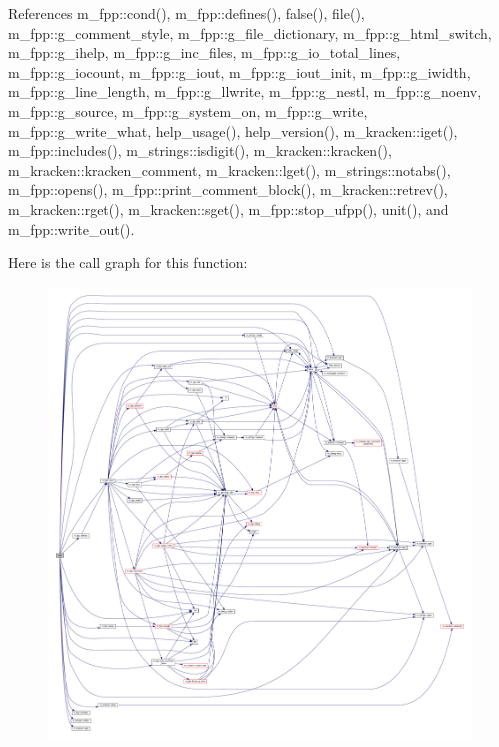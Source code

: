 References m\+\_\+fpp\+::cond(), m\+\_\+fpp\+::defines(), false(), file(), m\+\_\+fpp\+::g\+\_\+comment\+\_\+style, m\+\_\+fpp\+::g\+\_\+file\+\_\+dictionary, m\+\_\+fpp\+::g\+\_\+html\+\_\+switch, m\+\_\+fpp\+::g\+\_\+ihelp, m\+\_\+fpp\+::g\+\_\+inc\+\_\+files, m\+\_\+fpp\+::g\+\_\+io\+\_\+total\+\_\+lines, m\+\_\+fpp\+::g\+\_\+iocount, m\+\_\+fpp\+::g\+\_\+iout, m\+\_\+fpp\+::g\+\_\+iout\+\_\+init, m\+\_\+fpp\+::g\+\_\+iwidth, m\+\_\+fpp\+::g\+\_\+line\+\_\+length, m\+\_\+fpp\+::g\+\_\+llwrite, m\+\_\+fpp\+::g\+\_\+nestl, m\+\_\+fpp\+::g\+\_\+noenv, m\+\_\+fpp\+::g\+\_\+source, m\+\_\+fpp\+::g\+\_\+system\+\_\+on, m\+\_\+fpp\+::g\+\_\+write, m\+\_\+fpp\+::g\+\_\+write\+\_\+what, help\+\_\+usage(), help\+\_\+version(), m\+\_\+kracken\+::iget(), m\+\_\+fpp\+::includes(), m\+\_\+strings\+::isdigit(), m\+\_\+kracken\+::kracken(), m\+\_\+kracken\+::kracken\+\_\+comment, m\+\_\+kracken\+::lget(), m\+\_\+strings\+::notabs(), m\+\_\+fpp\+::opens(), m\+\_\+fpp\+::print\+\_\+comment\+\_\+block(), m\+\_\+kracken\+::retrev(), m\+\_\+kracken\+::rget(), m\+\_\+kracken\+::sget(), m\+\_\+fpp\+::stop\+\_\+ufpp(), unit(), and m\+\_\+fpp\+::write\+\_\+out().

Here is the call graph for this function\+:
\nopagebreak
\begin{figure}[H]
\begin{center}
\leavevmode
\includegraphics[width=350pt]{ufpp_8f90_ae38e75311f766ddb27e1389ad1e8f7cc_cgraph}
\end{center}
\end{figure}
